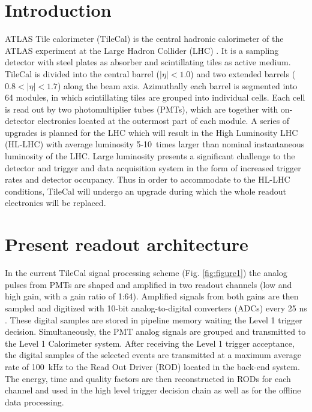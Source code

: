 \documentclass[10pt]{article}
\begin{document}
\normalsize 


\section{Introduction}

ATLAS Tile calorimeter (TileCal) is the central hadronic calorimeter of the ATLAS experiment at the Large Hadron Collider (LHC) \cite{1}. It is a sampling detector with steel plates as absorber and scintillating tiles as active medium. TileCal is divided into the central barrel ($|\eta|<1.0$) and two extended barrels ($0.8<|\eta|<1.7$) along the beam axis. Azimuthally each barrel is segmented into 64 modules, in which scintillating tiles are grouped into individual cells. Each cell is read out by two photomultiplier tubes (PMTs), which are together with on-detector electronics located at the outermost part of each module. 
A series of upgrades is planned for the LHC which will result in the High Luminosity LHC (HL-LHC) with average luminosity 5-10~times larger than nominal instantaneous luminosity of the LHC. 
Large luminosity presents a significant challenge to the detector and trigger and data acquisition system in the form of increased trigger rates and detector occupancy.
Thus in order to accommodate to the HL-LHC conditions, TileCal will undergo an upgrade during which the whole readout electronics will be replaced.

\section{Present readout architecture}
In the current TileCal signal processing scheme (Fig. \ref{fig:figure1}) the analog pulses from PMTs are shaped and amplified in two readout channels (low and high gain, with a gain ratio of 1:64). Amplified signals from both gains are then sampled and digitized with 10-bit analog-to-digital converters (ADCs) every 25 ns \cite{3}. These digital samples are stored in pipeline memory waiting the Level 1 trigger decision. Simultaneously, the PMT analog signals are grouped and transmitted to the Level 1 Calorimeter system. After receiving the Level 1 trigger acceptance, the digital samples of the selected events are transmitted at a maximum average rate of 100~kHz to the Read Out Driver (ROD) located in the back-end system. The energy, time and quality factors are then reconstructed in RODs for each channel and used in the high level trigger decision chain as well as for the offline data processing. 
\end{document}

